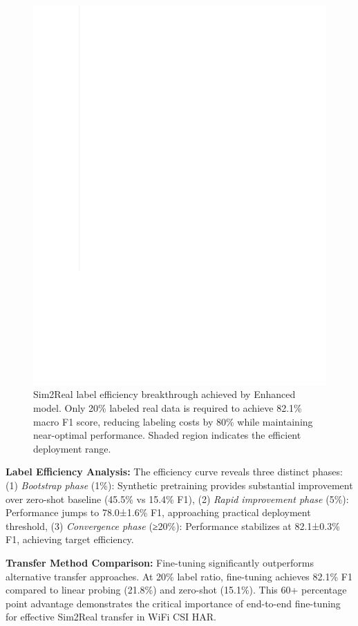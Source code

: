 \documentclass[journal]{IEEEtran}
\begin{document}
\begin{figure}[ht]
\centering
\includegraphics[width=\columnwidth]{figures/figure4_stea_basic.pdf}
\caption{Sim2Real label efficiency breakthrough achieved by Enhanced model. Only 20\% labeled real data is required to achieve 82.1\% macro F1 score, reducing labeling costs by 80\% while maintaining near-optimal performance. Shaded region indicates the efficient deployment range.}
\label{fig:label_efficiency}
\end{figure}

\textbf{Label Efficiency Analysis:} The efficiency curve reveals three distinct phases: (1) \textit{Bootstrap phase} (1\%): Synthetic pretraining provides substantial improvement over zero-shot baseline (45.5\% vs 15.4\% F1), (2) \textit{Rapid improvement phase} (5\%): Performance jumps to 78.0±1.6\% F1, approaching practical deployment threshold, (3) \textit{Convergence phase} (≥20\%): Performance stabilizes at 82.1±0.3\% F1, achieving target efficiency.

\textbf{Transfer Method Comparison:} Fine-tuning significantly outperforms alternative transfer approaches. At 20\% label ratio, fine-tuning achieves 82.1\% F1 compared to linear probing (21.8\%) and zero-shot (15.1\%). This 60+ percentage point advantage demonstrates the critical importance of end-to-end fine-tuning for effective Sim2Real transfer in WiFi CSI HAR.
\end{document}
